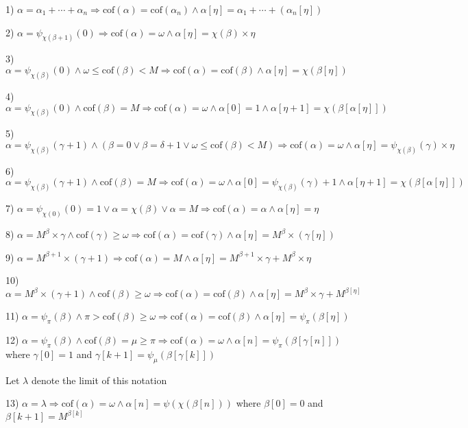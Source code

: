 \documentclass[10pt]{article}
\begin{document}
1) \(\alpha=\alpha_1+\cdots+\alpha_n\Rightarrow\text{cof}(\alpha)=\text{cof}(\alpha_n)\wedge\alpha[\eta]=\alpha_1+\cdots+(\alpha_n[\eta])\)

2) \(\alpha=\psi_{\chi(\beta+1)}(0)\Rightarrow\text{cof}(\alpha)=\omega\wedge\alpha[\eta]=\chi(\beta)\times \eta\)

3) \(\alpha=\psi_{\chi(\beta)}(0)\wedge\omega\le\text{cof}(\beta)<M\Rightarrow\text{cof}(\alpha)=\text{cof}(\beta)\wedge\alpha[\eta]=\chi(\beta[\eta])\)

4) \(\alpha=\psi_{\chi(\beta)}(0)\wedge\text{cof}(\beta)=M\Rightarrow\text{cof}(\alpha)=\omega\wedge\alpha[0]=1\wedge\alpha[\eta+1]=\chi(\beta[\alpha[\eta]])\)

5)  \(\alpha=\psi_{\chi(\beta)}(\gamma+1)\wedge(\beta=0\vee\beta=\delta+1\vee\omega\le\text{cof}(\beta)<M)\Rightarrow\text{cof}(\alpha)=\omega\wedge\alpha[\eta]=\psi_{\chi(\beta)}(\gamma)\times \eta\)

6)  \(\alpha=\psi_{\chi(\beta)}(\gamma+1)\wedge\text{cof}(\beta)=M\Rightarrow\text{cof}(\alpha)=\omega\wedge\alpha[0]=\psi_{\chi(\beta)}(\gamma)+1\wedge\alpha[\eta+1]=\chi(\beta[\alpha[\eta]])\)

7)  \(\alpha=\psi_{\chi(0)}(0)=1\vee\alpha=\chi(\beta)\vee\alpha=M\Rightarrow\text{cof}(\alpha)=\alpha\wedge\alpha[\eta]=\eta\)

8) \(\alpha=M^{\beta}\times\gamma \wedge \text{cof} (\gamma)\geq\omega \Rightarrow \text{cof} (\alpha)= \text{cof}(\gamma)\wedge\alpha[\eta]=M^{\beta}\times(\gamma[\eta])\)

9) \(\alpha=M^{\beta+1}\times(\gamma+1) \Rightarrow \text{cof} (\alpha)=M \wedge\alpha[\eta]=M^{\beta+1}\times\gamma+M^\beta\times\eta\)

10) \(\alpha=M^\beta\times(\gamma+1) \wedge\text{cof}(\beta)\geq\omega \Rightarrow \text{cof}(\alpha)= \text{cof}(\beta) \wedge \alpha[\eta]=M^\beta\times\gamma+M^{\beta[\eta]}\)

11) \(\alpha=\psi_\pi(\beta) \wedge \pi>\text{cof}(\beta)\geq\omega \Rightarrow \text{cof} (\alpha)= \text{cof}(\beta) \wedge \alpha[\eta]=\psi_\pi(\beta[\eta])\)

12) \(\alpha=\psi_\pi(\beta) \wedge \text{cof}(\beta)=\mu\geq\pi \Rightarrow \text{cof} (\alpha)=\omega \wedge \alpha[n]=\psi _\pi(\beta[\gamma[n]])\) where  \(\gamma[0]=1\) and  \(\gamma[k+1]=\psi_\mu(\beta[\gamma[k]])\)

Let \(\lambda\) denote the limit of this notation

13) \(\alpha=\lambda\Rightarrow\text{cof} (\alpha)=\omega \wedge \alpha[n]=\psi(\chi(\beta[n]))\) where \(\beta[0]=0\) 
and \(\beta[k+1]=M^{\beta[k]}\)
\end{document}
